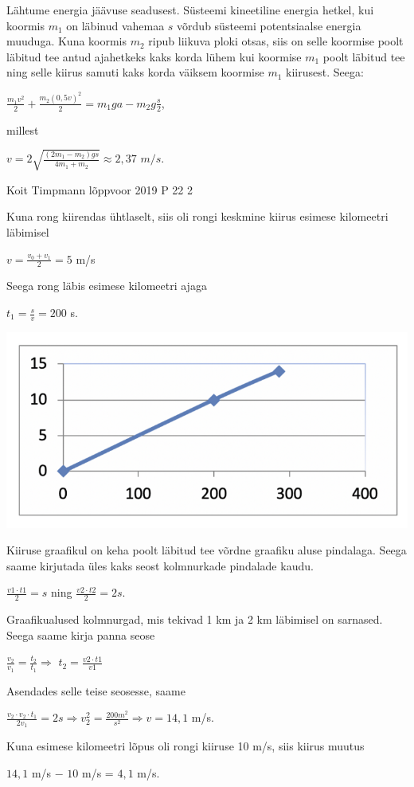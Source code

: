 \documentclass[11pt]{article}
\begin{document}
{{\ifSolution
Lähtume energia jäävuse seadusest. Süsteemi kineetiline energia hetkel, kui koormis $m_1$ on läbinud vahemaa $s$ võrdub süsteemi potentsiaalse energia muuduga. Kuna koormis $m_2$ ripub liikuva ploki otsas, siis on selle koormise poolt läbitud tee antud ajahetkeks kaks korda lühem kui koormise $m_1$ poolt läbitud tee ning selle kiirus samuti kaks korda väiksem koormise $m_1$ kiirusest.
Seega: 
\begin{center}
$\frac{m_1 v^2}{2} + \frac{m_2(0,5v)^2}{2} = m_1ga - m_2g\frac{s}{2}$,
\end{center}
millest
\begin{center}
$v = 2\sqrt{\frac{(2m_1 - m_2)gs}{4m_1 + m_2}} \approx 2,37$ $m/s$.
\end{center}
\fi
}

{Koit Timpmann} %
{lõppvoor} %
{2019} %
{P 22} %
{2} %
{

\ifSolution
Kuna rong kiirendas ühtlaselt, siis oli rongi keskmine kiirus esimese kilomeetri läbimisel
\begin{center}
$v = \frac{v_0 + v_1}{2} = 5$ m/s
\end{center}
Seega rong läbis esimese kilomeetri ajaga 
\begin{center}
$t_1 = \frac{s}{v} = 200$ s.
\end{center}
\begin{center}
	\includegraphics[width=0.5\linewidth]{2019-v3p-22-lah.PNG}
\end{center}
Kiiruse graafikul on keha poolt läbitud tee võrdne graafiku aluse pindalaga. Seega saame kirjutada üles kaks seost kolmnurkade pindalade kaudu.
\begin{center}
$\frac {v1 \cdot t1}{2} = s$ ning $\frac {v2 \cdot t2}{2} = 2s$.
\end{center}
Graafikualused kolmnurgad, mis tekivad 1 km ja 2 km läbimisel on sarnased. Seega saame kirja panna seose
\begin{center}
$\frac{v_2}{v_1} = \frac{t_2}{t_1} \Rightarrow $ $t_2 = \frac{v2 \cdot t1}{v1} $
\end{center}
Asendades selle teise seosesse, saame
\begin{center}
$\frac{v_2 \cdot v_2 \cdot t_1}{2 v_1} = 2s \Rightarrow v_2^2 = \frac{200 m^2}{s^2} \Rightarrow v = 14,1$ m/s. 
\end{center}
Kuna esimese kilomeetri lõpus oli rongi kiiruse 10 m/s, siis kiirus muutus
\begin{center}
$14,1$ m/s $-$ $10$ m/s = $4,1$ m/s.
\end{center}
\fi
}

}
\end{document}
